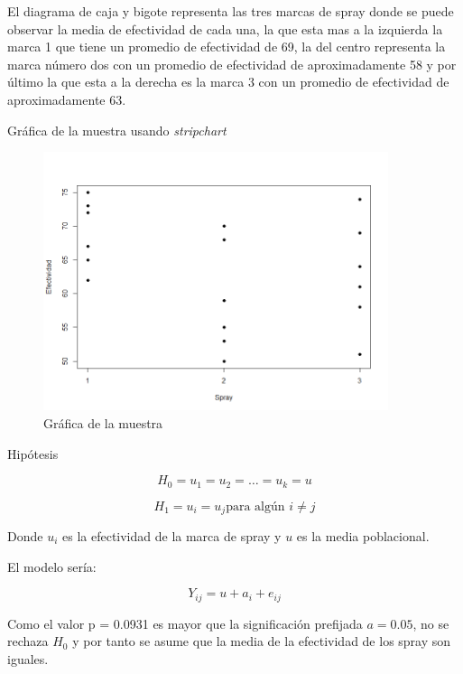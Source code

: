 \documentclass{article}
\begin{document}
		
		\begin{flushleft}
			El diagrama de caja y bigote representa las tres marcas de spray donde se puede observar la media de
			efectividad de cada una, la que esta mas a la izquierda  la marca 1 que  tiene un promedio de efectividad de 69,
			la del centro  representa la marca n\'umero dos con un promedio de efectividad de aproximadamente 58 y por
			\'ultimo la que esta a la derecha  es la marca 3 con un promedio de efectividad de aproximadamente 63.
		\end{flushleft}
		
		\vspace*{1cm}
		
		\begin{flushleft}
			Gr\'afica de la muestra usando \textit{stripchart}
		\end{flushleft}
		
		\begin{figure}[H]
			\centering
			\includegraphics[width=0.9\textwidth]{img/ej1cp8-graficadelamuestra.png}
			\caption{Gr\'afica de la muestra }
			\label{fig:ejemplo}
		\end{figure}
		
		\begin{flushleft}
			Hip\'otesis
		\end{flushleft}
		
		$$
			H_0 = u_1 = u_2 = \dots = u_k = u
		$$
		
		$$
		H_1 = u_i=u_j \mbox{para alg\'un $i \neq j$}
		$$
		
		Donde $u_i$ es la efectividad de la marca de spray y $u$  es la media poblacional.
		
		
		\begin{flushleft}
			El modelo ser\'ia:
		\end{flushleft}
		
		$$
		Y_{ij} = u + a_i + e_{ij}
		$$
		
		Como el valor p = 0.0931 es mayor que la significaci\'on prefijada 
		$a=0.05$, no se rechaza $H_0$ y por tanto
		se asume que la media de la efectividad de los spray son iguales.
\end{document}

